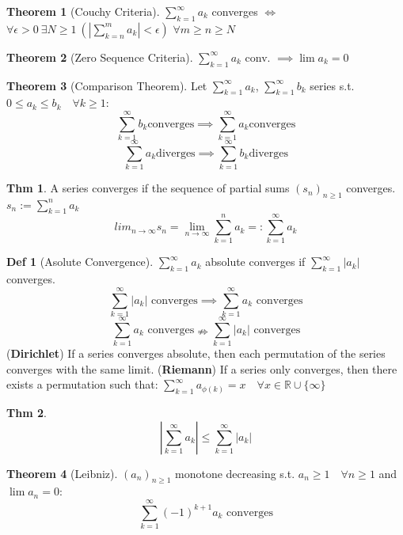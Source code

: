 \documentclass[a4paper, 10pt]{article}
\theoremstyle{definition}
\newtheorem*{theorem}{Thm}
\newtheorem*{definition}{Def}
\theoremstyle{named}
\newtheorem*{ntheorem_wrapper}{Theorem}
\newenvironment{ntheorem}%
    {\begin{mdframed}[style=important]\begin{ntheorem_wrapper}}%
    {\end{ntheorem_wrapper}\end{mdframed}}
\newcommand{\R}{\mathbb{R}}
\begin{document}
\begin{ntheorem}[Couchy Criteria]
    $\sum_{k = 1}^\infty a_k$ converges $\iff$ $\forall \epsilon > 0 \ \exists N \geq 1 \ (|\sum_{k = n}^m a_k| < \epsilon)$ $\forall m\geq n \geq N$
\end{ntheorem}

\begin{ntheorem}[Zero Sequence Criteria]
    $\sum_{k=1}^\infty a_k$ conv. $\implies \lim a_k = 0$
\end{ntheorem}

\begin{ntheorem}[Comparison Theorem]
    Let $\sum_{k = 1}^\infty a_k$, $\sum_{k = 1}^\infty b_k$ series s.t. $0 \leq a_k \leq b_k \quad \forall k \geq 1$:
    $$\sum_{k=1}^\infty b_k \text{converges} \implies \sum_{k = 1}^\infty a_k \text{converges}$$
    $$\sum_{k = 1}^\infty  a_k \text{diverges} \implies \sum_{k = 1}^\infty  b_k \text{diverges}$$
\end{ntheorem}

\begin{theorem}
    A series converges if the sequence of partial sums $(s_n)_{n \geq 1}$ converges. $s_n := \sum_{k = 1}^n a_k$
    $$lim_{n \to \infty} s_n = \lim_{n \to \infty} \sum_{k = 1}^n a_k =: \sum_{k=1}^\infty a_k$$
\end{theorem}

\begin{definition}[Asolute Convergence]
    $\sum_{k=1}^\infty a_k$ absolute converges if $\sum_{k=1}^\infty |a_k|$ converges.
    $$\sum_{k = 1}^\infty |a_k| \text{ converges} \implies \sum_{k=1}^\infty a_k \text{ converges}$$
    $$\sum_{k=1}^\infty a_k \text{ converges} \nRightarrow \sum_{k=1}^\infty |a_k| \text{ converges}$$
    (\textbf{Dirichlet}) If a series converges absolute, then each permutation of the series converges with the same limit.
    (\textbf{Riemann}) If a series only converges, then there exists a permutation such that: \newline $\sum_{k=1}^\infty a_{\phi(k)} = x \quad \forall x \in \R \cup \{\infty\}$
\end{definition}

\begin{theorem}
    $$|\sum_{k=1}^\infty a_k| \leq \sum_{k=1}^\infty |a_k|$$
\end{theorem}

\begin{ntheorem}[Leibniz]
    $(a_n)_{n\geq1}$ monotone decreasing s.t. $a_n \geq 1 \quad \forall n \geq 1$ and $\lim a_n = 0$:
    $$\sum_{k=1}^\infty (-1)^{k + 1} a_k \text{ converges}$$
\end{ntheorem}
\end{document}

